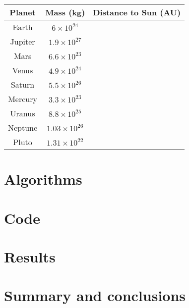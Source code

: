 \documentclass[12pt, a4paper]{article}
\begin{document}
\begin{table}
\begin{center}
\begin{tabular}{ccc} \hline\hline
Planet & Mass (kg) & Distance to Sun (AU) \\ \hline 
Earth & $6\times10^{24}$ &  \\
Jupiter & $1.9\times10^{27}$ &  \\
Mars & $6.6\times10^{23}$ &  \\
Venus & $4.9\times10^{24}$ &  \\
Saturn & $5.5\times10^{26}$ & \\ 
Mercury & $3.3\times10^{23}$ & \\ 
Uranus & $8.8\times10^{25}$ & \\ 
Neptune & $1.03\times10^{26}$ &  \\ 
Pluto & $1.31\times10^{22}$ & \\ \hline 
\end{tabular}
\end{center}
\end{table}

\section{Algorithms}

\section{Code}

\section{Results}

\section{Summary and conclusions}
\end{document}
